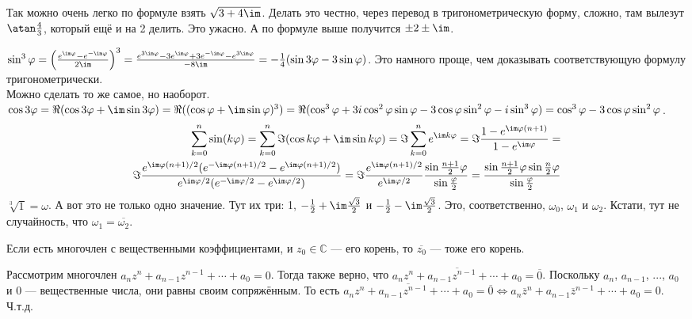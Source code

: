\documentclass{article}
\begin{document}
\begin{itemize}
\begin{Comment}
        \end{Comment}
        \begin{Example}
            Так можно очень легко по формуле взять $\sqrt{3+4\im}$. Делать это честно, через перевод в тригонометрическую форму, сложно, там вылезут $\atan\frac43$, который ещё и на 2 делить. Это ужасно. А по формуле выше получится $\pm2\pm\im$.
        \end{Example}
        \begin{Example}
            $\sin^3\varphi=\left(\frac{e^{\im\varphi}-e^{-\im\varphi}}{2\im}\right)^3=\frac{e^{3\im\varphi}-3e^{\im\varphi}+3e^{-\im\varphi}-e^{3\im\varphi}}{-8\im}=-\frac14(\sin3\varphi-3\sin\varphi)$. Это намного проще, чем доказывать соответствующую формулу тригонометрически.\\
            Можно сделать то же самое, но наоборот. $\cos3\varphi=\Re(\cos3\varphi+\im\sin3\varphi)=\Re((\cos\varphi+\im\sin\varphi)^3)=\Re(\cos^3\varphi+3i\cos^2\varphi\sin\varphi-3\cos\varphi\sin^2\varphi-i\sin^3\varphi)=\cos^3\varphi-3\cos\varphi\sin^2\varphi$.
            \[\begin{split}
                \sum_{k=0}^n\sin(k\varphi)=\sum_{k=0}^n\Im(\cos k\varphi+\im\sin k\varphi)=\Im\sum_{k=0}^ne^{\im k\varphi}=\Im\frac{1-e^{\im\varphi(n+1)}}{1-e^{\im\varphi}}=\\
                \Im\frac{e^{\im\varphi(n+1)/2}(e^{-\im\varphi(n+1)/2}-e^{\im\varphi(n+1)/2})}{e^{\im\varphi/2}(e^{-\im\varphi/2}-e^{\im\varphi/2})}=
                \Im\frac{e^{\im\varphi(n+1)/2}}{e^{\im\varphi/2}}
                \frac{\sin\frac{n+1}2\varphi}{\sin\frac{\varphi}2}=
                \frac{\sin\frac{n+1}2\varphi\sin\frac n2\varphi}{\sin\frac{\varphi}2}
            \end{split}\]
            $\sqrt[3]1=\omega$. А вот это не только одно значение. Тут их три: 1, $-\frac12+\im\frac{\sqrt3}2$ и $-\frac12-\im\frac{\sqrt3}2$. Это, соответственно, $\omega_0$, $\omega_1$ и $\omega_2$. Кстати, тут не случайность, что $\omega_1=\overline{\omega_2}$.
        \end{Example}
        \thm Если есть многочлен с вещественными коэффициентами, и $z_0\in\mathbb C$ --- его корень, то $\overline{z_0}$ --- тоже его корень.
        \begin{Proof}
            Рассмотрим многочлен $a_nz^n+a_{n-1}z^{n-1}+\cdots+a_0=0$. Тогда также верно, что $\overline{a_nz^n+a_{n-1}z^{n-1}+\cdots+a_0}=\overline0$. Поскольку $a_n$, $a_{n-1}$, ..., $a_0$ и 0 --- вещественные числа, они равны своим сопряжённым. То есть $\overline{a_nz^n+a_{n-1}z^{n-1}+\cdots+a_0}=\overline0\Leftrightarrow a_n\overline{z}^n+a_{n-1}\overline{z}^{n-1}+\cdots+a_0=0$. Ч.т.д.

\end{Proof}
\end{itemize}
\end{document}
